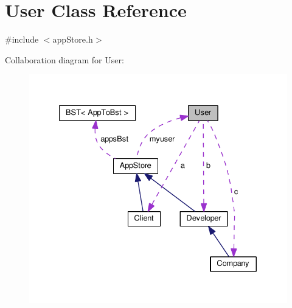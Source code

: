 \hypertarget{class_user}{\section{User Class Reference}
\label{class_user}
}


{\ttfamily \#include $<$app\-Store.\-h$>$}



Collaboration diagram for User\-:
\nopagebreak
\begin{figure}[H]
\begin{center}
\leavevmode
\includegraphics[width=332pt]{class_user__coll__graph}
\end{center}
\end{figure}
